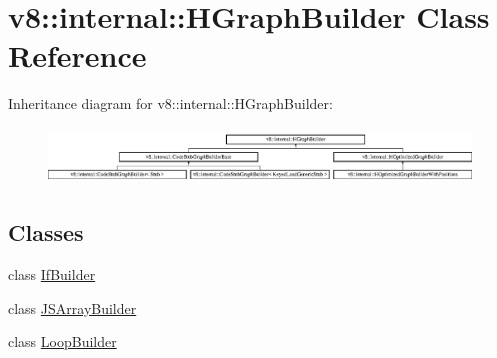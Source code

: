 \hypertarget{classv8_1_1internal_1_1_h_graph_builder}{}\section{v8\+:\+:internal\+:\+:H\+Graph\+Builder Class Reference}
\label{classv8_1_1internal_1_1_h_graph_builder}
Inheritance diagram for v8\+:\+:internal\+:\+:H\+Graph\+Builder\+:\begin{figure}[H]
\begin{center}
\leavevmode
\includegraphics[height=1.489362cm]{classv8_1_1internal_1_1_h_graph_builder}
\end{center}
\end{figure}
\subsection*{Classes}
\begin{DoxyCompactItemize}
\item 
class \hyperlink{classv8_1_1internal_1_1_h_graph_builder_1_1_if_builder}{If\+Builder}
\item 
class \hyperlink{classv8_1_1internal_1_1_h_graph_builder_1_1_j_s_array_builder}{J\+S\+Array\+Builder}
\item 
class \hyperlink{classv8_1_1internal_1_1_h_graph_builder_1_1_loop_builder}{Loop\+Builder}
\end{DoxyCompactItemize}

